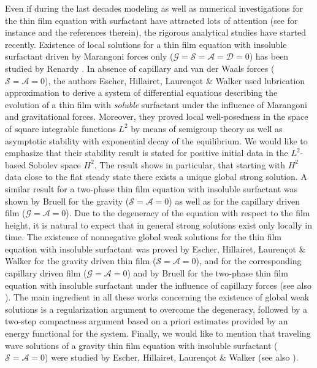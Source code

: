 \documentclass[reqno,11pt]{amsart}
\begin{document}
Even if during the last decades modeling as well as numerical investigations for the thin film equation with surfactant have attracted lots of attention (see for instance \cite{GG, JG, JG2, BGN03, BN04, WCM,ECM} and the references therein), the rigorous analytical studies have started recently. Existence of local solutions for a thin film equation with insoluble surfactant driven by Marangoni forces only ($\mathcal G = \mathcal S =\mathcal A=\mathcal D=0$) has been studied by Renardy \cite{R1}. In absence of capillary and van der Waals forces ($\mathcal S=\mathcal A=0$), the authors Escher, Hillairet, Lauren{\c{c}}ot \& Walker \cite{EHLW1} used lubrication approximation to derive a system of differential equations describing the evolution of a thin film with \emph{soluble} surfactant under the influence of Marangoni and gravitational forces. Moreover, they proved local well-posedness in the space of square integrable functions $L^2$ by means of semigroup theory as well as asymptotic stability with exponential decay of the equilibrium. We would like to emphasize that their stability result is stated for positive initial data in the $L^2$-based Sobolev space $H^2$. The result shows in particular, that starting with $H^2$ data close to the flat steady state there exists a unique global strong solution. A similar result for a two-phase thin film equation with insoluble surfactant was shown by Bruell \cite{B1} for the gravity ($\mathcal S =\mathcal A=0$) as well as for the capillary driven film  ($\mathcal G=\mathcal A=0$). 
Due to the degeneracy of the equation with respect to the film height, it is natural to expect that in general strong solutions exist only locally in time. The existence of nonnegative global weak solutions for the thin film equation with insoluble surfactant was proved by Escher, Hillairet, Lauren{\c{c}}ot \& Walker \cite{EHLW11} for the gravity driven thin film  ($\mathcal S=\mathcal A=0$), and \cite{EHLW4th} for the corresponding capillary driven film ($\mathcal G=\mathcal A=0$) and by Bruell \cite{B2} for the two-phase thin film equation with insoluble surfactant under the influence of capillary forces (see also \cite{GW06, CT13}). The main ingredient in all these works concerning the existence of global weak solutions is a regularization argument to overcome the degeneracy, followed by a two-step compactness argument based on a priori estimates provided by an energy functional for the system. Finally, we would like to mention that traveling wave solutions of a gravity thin film equation with insoluble surfactant ($\mathcal S=\mathcal A=0$) were studied by Escher, Hillairet, Lauren{\c{c}}ot \& Walker \cite{EHLWtrav} (see also \cite{EL17}).
\end{document}
